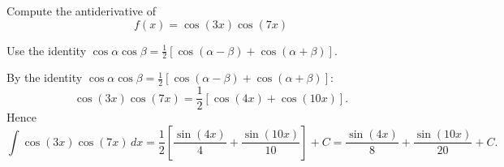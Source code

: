 
\begin{question}
Compute the antiderivative of
\[ f(x)=\cos(3x)\cos(7x) \]
\end{question}

\begin{hint}
Use the identity $\cos\alpha\cos\beta=\frac12\left[\cos(\alpha-\beta)+\cos(\alpha+\beta)\right]$.
\end{hint}

\begin{solution}
By the identity $\cos\alpha\cos\beta=\frac12\left[\cos(\alpha-\beta)+\cos(\alpha+\beta)\right]$:
\[ \cos(3x)\cos(7x)=\frac12\left[\cos(4x)+\cos(10x)\right]. \]
Hence
\[ \int\cos(3x)\cos(7x)\,dx=\frac12\left[\frac{\sin(4x)}{4}+\frac{\sin(10x)}{10}\right]+C=\boxed{\frac{\sin(4x)}{8}+\frac{\sin(10x)}{20}+C}. \]
\end{solution}
